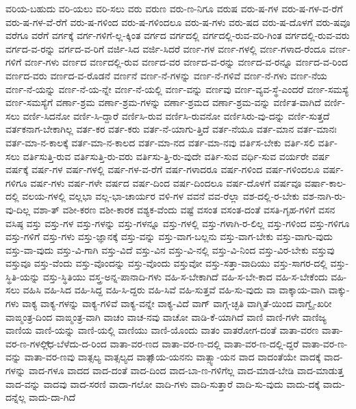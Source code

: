 {ವರಿಯ-ಬಹುದು
ವರಿ-ಯಲು
ವರಿ-ಸಲು
ವರು
ವರುಣ
ವರು-ಣ-ನಿಗೂ
ವರುಷ
ವರು-ಷ-ಗಳ
ವರು-ಷ-ಗಳ-ವ-ರೆಗೆ
ವರು-ಷ-ಗಳ-ವೆ-ರೆಗೆ
ವರು-ಷ-ಗಳಿಂದ
ವರು-ಷ-ಗಳಿಂದಲೂ
ವರು-ಷ-ಗಳು
ವರು-ಷದ
ವರು-ಷ-ದೊಳಗೆ
ವರು-ಷವೂ
ವರೆಗೂ
ವರೆಗೆ
ವರ್ಗಕ್ಕೆ
ವರ್ಗ-ಗಳಿಗೆ-ಲ್ಲ-ಕ್ಕಿಂತ
ವರ್ಗದ
ವರ್ಗದಲ್ಲಿ
ವರ್ಗದಲ್ಲಿ-ರುವ-ವರಿ-ಗಿಂತ
ವರ್ಗದಲ್ಲಿ-ರುವ-ವರು
ವರ್ಗದ-ವ-ರನ್ನು
ವರ್ಗದ-ವ-ರಿಗೆ
ವರ್ಜಿ-ಸಿದ
ವರ್ಜಿ-ಸಿದರೆ
ವರ್ಣ-ಗಳ
ವರ್ಣ-ಗಳಲ್ಲಿ
ವರ್ಣ-ಗಳಾದ-ರೆಂದೂ
ವರ್ಣ-ಗಳಿಗೆ
ವರ್ಣ-ಗಳು
ವರ್ಣದ
ವರ್ಣದಲ್ಲಿ-ರುವ
ವರ್ಣದ-ವರ
ವರ್ಣದ-ವ-ರನ್ನು
ವರ್ಣದ-ವ-ರನ್ನೂ
ವರ್ಣದ-ವ-ರಿಂದ
ವರ್ಣದ-ವರು
ವರ್ಣದ-ವ-ರೊಡನೆ
ವರ್ಣನೆ
ವರ್ಣ-ನೆ-ಗಳನ್ನು
ವರ್ಣ-ನೆ-ಗಳಿವೆ
ವರ್ಣ-ನೆ-ಗಳು
ವರ್ಣ-ನೆಯ
ವರ್ಣ-ನೆ-ಯನ್ನು
ವರ್ಣ-ನೆ-ಯ-ನ್ನೇ
ವರ್ಣ-ನೆ-ಯಲ್ಲಿ
ವರ್ಣ-ವನ್ನು
ವರ್ಣವು
ವರ್ಣ-ವ್ಯವ-ಸ್ಥೆ-ಎಂದರೆ
ವರ್ಣ-ಸಮಸ್ಯೆ
ವರ್ಣ-ಸಮಸ್ಯೆಗೆ
ವರ್ಣಾ-ಶ್ರಮ
ವರ್ಣಾ-ಶ್ರಮ-ಗಳನ್ನು
ವರ್ಣಾ-ಶ್ರಮದ
ವರ್ಣಾ-ಶ್ರಮ-ವನ್ನು
ವರ್ಣಿತ-ವಾಗಿದೆ
ವರ್ಣಿ-ಸಲು
ವರ್ಣಿ-ಸಿದನೋ
ವರ್ಣಿ-ಸಿ-ದ್ದಾರೆ
ವರ್ಣಿಸಿ-ರುವ
ವರ್ಣಿಸಿ-ರುವನೋ
ವರ್ಣಿಸಿರು-ವು-ದನ್ನು
ವರ್ಣಿ-ಸುತ್ತದೆ
ವರ್ತಕನಾಗ-ಬೇಕಾಗಿಲ್ಲ
ವರ್ತ-ಕರ
ವರ್ತ-ಕರು
ವರ್ತ-ನೆ-ಯಾಗು-ತ್ತಿದೆ
ವರ್ತ-ನೆಯೂ
ವರ್ತ-ಮಾನ
ವರ್ತ-ಮಾನಃ
ವರ್ತ-ಮಾ-ನ-ಕಾಲಕ್ಕೆ
ವರ್ತ-ಮಾ-ನ-ಕಾಲದ
ವರ್ತ-ಮಾ-ನದ
ವರ್ತ-ಮಾ-ನವು
ವರ್ತಿಸ-ಬೇಕು
ವರ್ತಿ-ಸಲಿ
ವರ್ತಿ-ಸಲು
ವರ್ತಿಸುತ್ತಿ-ರುವ
ವರ್ತಿಸುತ್ತಿ-ರು-ವರು
ವರ್ತಿಸು-ತ್ತಿ-ರು-ವುದೇ
ವರ್ತಿ-ಸುವ
ವರ್ಧಿ-ಸುವ
ವರ್ಯರೇ
ವರ್ಷ
ವರ್ಷಕ್ಕೆ
ವರ್ಷ-ಗಳ
ವರ್ಷ-ಗಳಲ್ಲಿ
ವರ್ಷ-ಗಳ-ವ-ರೆಗೆ
ವರ್ಷ-ಗಳಾದರೂ
ವರ್ಷ-ಗಳಿಂದ
ವರ್ಷ-ಗಳಿಂದಲೂ
ವರ್ಷ-ಗಳಿಗೂ
ವರ್ಷ-ಗಳು
ವರ್ಷ-ಗಳೇ
ವರ್ಷದ
ವರ್ಷ-ದಿಂದ
ವರ್ಷ-ದಿಂದಲೂ
ವರ್ಷ-ದೊಳಗೆ
ವರ್ಷವೂ
ವರ್ಷಾ-ಕಾಲ-ದಲ್ಲಿ
ವಲಯ-ಗಳಲ್ಲಿ
ವಲ್ಲಭಾ
ವಲ್ಲ-ಭಾ-ಚಾರ್ಯರ
ವಳಿ-ಗಳ
ವವನೆ
ವವ-ರೆಲ್ಲಾ
ವಶ-ದಲ್ಲಿ-ರ-ಬೇಕು
ವಶ-ನಾಗಿ-ರು-ವು-ದಿಲ್ಲ
ವಶಾ-ತ್
ವಶೀ-ಕರಣ
ವಶೀ-ಕಾರಕ
ವಶ್ಯಕ-ವೆಂದು
ವಷ್ಟೆ
ವಸಂತ
ವಸಂತ-ದಂತೆ
ವಸತಿ-ಗೃಹ-ಗಳಿಗೆ
ವಸನ
ವಸಿಷ್ಠ
ವಸ್ತು
ವಸ್ತು-ಗಳ
ವಸ್ತು-ಗಳನ್ನು
ವಸ್ತು-ಗಳನ್ನೂ
ವಸ್ತು-ಗಳಲ್ಲಿ
ವಸ್ತು-ಗಳಾಗಿ-ರ-ಲಿಲ್ಲ
ವಸ್ತು-ಗಳಿಂದ
ವಸ್ತು-ಗಳಿಗೂ
ವಸ್ತು-ಗಳಿಗೆ
ವಸ್ತು-ಗಳು
ವಸ್ತು-ಜ್ಞಾನಕ್ಕೆ
ವಸ್ತು-ವನ್ನು
ವಸ್ತು-ವಾಗ-ಬಲ್ಲನು
ವಸ್ತು-ವಾಗ-ಬೇಕು
ವಸ್ತು-ವಾಗು-ವುದು
ವಸ್ತು-ವಾ-ವುದು
ವಸ್ತು-ವಿ-ಗಾಗಿ
ವಸ್ತು-ವಿದೆ
ವಸ್ತು-ವಿನ
ವಸ್ತು-ವಿ-ನಲ್ಲಿ
ವಸ್ತು-ವಿ-ನಿಂದ
ವಸ್ತು-ವಿರ-ಬೇಕು
ವಸ್ತುವು
ವಸ್ತುವೂ
ವಸ್ತು-ವೆಂದು
ವಸ್ತು-ವೊಂದನ್ನು
ವಸ್ತು-ವೊಂದು
ವಸ್ತುವೋ
ವಸ್ತು-ಸತ್ತಾ-ವಾದಿಯು
ವಸ್ತು-ಸಾಗರ-ದಲ್ಲಿ
ವಸ್ತು-ಸ್ಥಿತಿ-ಯನ್ನು
ವಸ್ತು-ಸ್ಥಿತಿಯು
ವಸ್ತ್ರ-ಅನ್ನ-ಪಾನಾದಿ-ಗಳು
ವಹಿ-ಸ-ಬೇಕಾಗಿದೆ
ವಹಿ-ಸ-ಬೇ-ಕಾದ
ವಹಿ-ಸ-ಬೇಕೆಂದು
ವಹಿ-ಸಲು
ವಹಿಸಿ
ವಹಿ-ಸಿದ
ವಹಿ-ಸಿದ್ದ
ವಹಿ-ಸಿ-ದ್ದರು
ವಹಿ-ಸಿವೆ
ವಹಿ-ಸುತ್ತವೆ
ವಹಿ-ಸು-ವುದು
ವಾ
ವಾಕ್ಕಾಯ-ವಾಗಿ
ವಾಕ್ಕು-ಗಳು
ವಾಕ್ಯ
ವಾಕ್ಯ-ಗಳನ್ನು
ವಾಕ್ಯ-ಗಳಿವೆ
ವಾಕ್ಯ-ವನ್ನೇ
ವಾಕ್ಯ-ವಿದೆ
ವಾಗ್
ವಾಗ್ಗ-ಚ್ಛತಿ
ವಾಗ್ಮಿತೆ-ಯಿಂದ
ವಾಗ್ವೈ-ಖರೀ
ವಾಙ್ಮಂತ್ರ-ದಿಂದ
ವಾಙ್ಮಂತ್ರ-ವಾಗಿ
ವಾಚಂ
ವಾಚ-ನವು
ವಾಚೋ
ವಾಡಿ-ಕೆ-ಯಾಗಿದೆ
ವಾಣಿ
ವಾಣಿ-ಗಳೇ
ವಾಣಿಜ್ಯ
ವಾಣಿಯ
ವಾಣಿ-ಯನ್ನು
ವಾಣಿ-ಯಲ್ಲಿ
ವಾಣಿಯು
ವಾಣಿ-ಯೊಂದು
ವಾತಂ
ವಾತರೋಗ-ದಂತೆ
ವಾತಾ-ವರಣ
ವಾತಾ-ವರ-ಣ-ಗಳಲ್ಲಿ್ಧ-ಬೆಳೆದು-ದ-ರಿಂದ
ವಾತಾ-ವರ-ಣದ
ವಾತಾ-ವರ-ಣ-ದಲ್ಲಿ
ವಾತಾ-ವರ-ಣ-ದಲ್ಲಿ-ದ್ದರೆ
ವಾತಾ-ವರ-ಣ-ವನ್ನು
ವಾತಾ-ವರ-ಣವು
ವಾತ್ಸಲ್ಯ
ವಾತ್ಸಲ್ಯದ
ವಾತ್ಸಾ್ಯ-ಯನನು
ವಾತ್ಸ್ಯಾ-ಯನ
ವಾದ
ವಾದಂತೆಯೇ
ವಾದಕ್ಕೆ
ವಾದ-ಗಳನ್ನು
ವಾದ-ಗಳೂ
ವಾದದ
ವಾದ-ದಂತೆ
ವಾದ-ದಿಂದ
ವಾದ-ಬಾ-ಣ-ಗಳಿಗೆಲ್ಲ
ವಾದ-ಮಾಡ-ಬೇಡಿ
ವಾದ-ಮಾಡುತ್ತ
ವಾದ-ವನ್ನು
ವಾದವು
ವಾದ-ಸರಣಿ
ವಾದಾ-ಗಲೋ
ವಾದಿ-ಗಳು
ವಾದಿ-ಸುತ್ತಾರೆ
ವಾದಿ-ಸು-ವುದು
ವಾದು-ದಕ್ಕೆ
ವಾದು-ದನ್ನೆಲ್ಲ
ವಾದು-ದಾ-ಗಿದೆ
}
